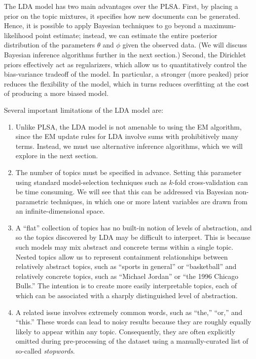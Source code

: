 \documentclass{article}
\begin{document}
The LDA model has two main advantages over the PLSA.
First, by placing a prior on the topic mixtures, it specifies how new documents can be generated.
Hence, it is possible to apply Bayesian techniques to go beyond a maximum-likelihood point estimate; instead, we can estimate the entire posterior distribution of the parameters $\theta$ and $\phi$ given the observed data.
(We will discuss Bayesian inference algorithms further in the next section.)
Second, the Dirichlet priors effectively act as regularizers, which allow us to quantitatively control the bias-variance tradeoff of the model.
In particular, a stronger (more peaked) prior reduces the flexibility of the model, which in turns reduces overfitting at the cost of producing a more biased model.

Several important limitations of the LDA model are:
\begin{enumerate}
\item Unlike PLSA, the LDA model is not amenable to using the EM algorithm, since the EM update rules for LDA involve sums with prohibitively many terms.
Instead, we must use alternative inference algorithms, which we will explore in the next section.
\item The number of topics must be specified in advance.
Setting this parameter using standard model-selection techniques such as $k$-fold cross-validation can be time consuming.
We will see that this can be addressed via Bayesian non-parametric techniques, in which one or more latent variables are drawn from an infinite-dimensional space.
\item A ``flat'' collection of topics has no built-in notion of levels of abstraction, and so the topics discovered by LDA may be difficult to interpret.
This is because such models may mix abstract and concrete terms within a single topic.
Nested topics allow us to represent containment relationships between relatively abstract topics, such as ``sports in general'' or ``basketball'' and relatively concrete topics, such as ``Michael Jordan'' or ``the 1996 Chicago Bulls.''
The intention is to create more easily interpretable topics, each of which can be associated with a sharply distinguished level of abstraction.
\item A related issue involves extremely common words, such as ``the,'' ``or,'' and ``this.''
These words can lead to noisy results because they are roughly equally likely to appear within any topic.
Consequently, they are often explicitly omitted during pre-processing of the dataset using a manually-curated list of so-called \emph{stopwords}.

\end{enumerate}
\end{document}
